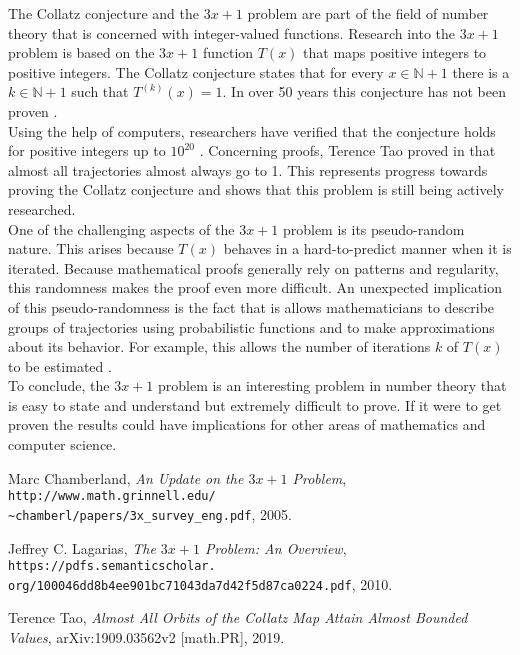 \documentclass[12pt,a4paper,reqno]{amsart}
\begin{document}
The Collatz conjecture and the $3x+1$ problem are part of the field of number 
theory that is concerned with integer-valued functions. Research into the 
$3x+1$ problem is based on the $3x+1$ function $T(x)$ that maps positive 
integers to positive integers. The Collatz conjecture states that for every 
$x \in \mathbb{N} + 1$ there is a $k \in \mathbb{N} + 1$ such that 
$T^{(k)}(x)=1$. In over 50 years this conjecture has not been proven
\cite{src:lagarias}. \\
Using the help of computers, researchers have verified that the conjecture
holds for positive integers up to $10^{20}$ \cite{src:tao}. Concerning proofs, 
Terence Tao proved in \cite{src:tao} that almost all trajectories almost always 
go to 1. This represents progress towards proving the Collatz conjecture and 
shows that this problem is still being actively researched. \\
One of the challenging aspects of the $3x+1$ problem is its pseudo-random
nature. This arises because $T(x)$ behaves in a hard-to-predict manner when it
is iterated. Because mathematical proofs generally rely on patterns and
regularity, this randomness makes the proof even more difficult. An unexpected
implication of this pseudo-randomness is the fact that is allows mathematicians
to describe groups of trajectories using probabilistic functions and to make
approximations about its behavior. For example, this allows the number of
iterations $k$ of $T(x)$ to be estimated \cite{src:lagarias}. \\
To conclude, the $3x+1$ problem is an interesting problem in number theory that
is easy to state and understand but extremely difficult to prove. If it were to
get proven the results could have implications for other areas of mathematics
and computer science.

\begin{thebibliography}{4}

 Marc Chamberland, 
    \textit{An Update on the $3x+1$ Problem}, 
    \texttt{http://www.math.grinnell.edu/\\
        \~{}chamberl/papers/3x\_survey\_eng.pdf}, 2005.

 Jeffrey C. Lagarias, 
    \textit{The $3x+1$ Problem: An Overview}, 
    \texttt{https://pdfs.semanticscholar.\\
        org/100046dd8b4ee901bc71043da7d42f5d87ca0224.pdf}, 2010.

 Terence Tao, \textit{Almost All Orbits of the Collatz Map Attain
    Almost Bounded Values}, arXiv:1909.03562v2 [math.PR], 2019.

\end{thebibliography}
\end{document}
